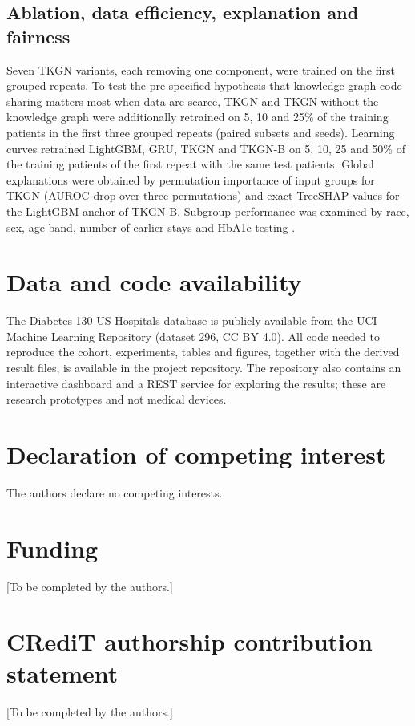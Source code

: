 \documentclass[preprint,12pt,authoryear]{elsarticle}
\begin{document}
\subsection{Ablation, data efficiency, explanation and fairness}
Seven TKGN variants, each removing one component, were trained on the
first \NAblRuns{} grouped repeats. To test the pre-specified hypothesis
that knowledge-graph code sharing matters most when data are scarce, TKGN
and TKGN without the knowledge graph were additionally retrained on 5, 10
and 25\% of the training patients in the first three grouped repeats (paired
subsets and seeds). Learning curves retrained LightGBM,
GRU, TKGN and TKGN-B on 5, 10, 25 and 50\% of the training patients of
the first repeat with the same test patients. Global explanations were
obtained by permutation importance of input groups for TKGN (AUROC drop
over three permutations) and exact TreeSHAP values \citep{lundberg2020}
for the LightGBM anchor of TKGN-B. Subgroup performance was examined by
race, sex, age band, number of earlier stays and HbA1c testing
\citep{obermeyer2019}.





\section*{Data and code availability}
The Diabetes 130-US Hospitals database is publicly available from the UCI
Machine Learning Repository (dataset 296, CC BY 4.0). All code needed to
reproduce the cohort, experiments, tables and figures, together with the
derived result files, is available in the project repository. The
repository also contains an interactive dashboard and a REST service for
exploring the results; these are research prototypes and not medical
devices.

\section*{Declaration of competing interest}
The authors declare no competing interests.

\section*{Funding}
[To be completed by the authors.]

\section*{CRediT authorship contribution statement}
[To be completed by the authors.]



\end{document}

